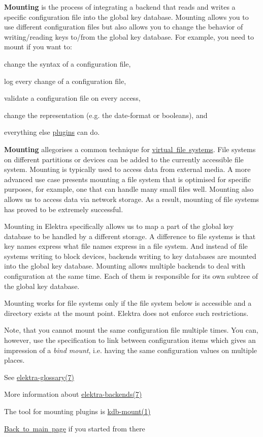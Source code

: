 {\bfseries{Mounting}} is the process of integrating a backend that reads and writes a specific configuration file into the global key database. Mounting allows you to use different configuration files but also allows you to change the behavior of writing/reading keys to/from the global key database. For example, you need to mount if you want to\+:


\begin{DoxyItemize}
\item change the syntax of a configuration file,
\item log every change of a configuration file,
\item validate a configuration file on every access,
\item change the representation (e.\+g. the date-\/format or booleans), and
\item everything else \mbox{\hyperlink{src_plugins_README_md}{plugins}} can do.
\end{DoxyItemize}

{\bfseries{Mounting}} allegorises a common technique for \mbox{\hyperlink{doc_BIGPICTURE_md}{virtual file systems}}. File systems on different partitions or devices can be added to the currently accessible file system. Mounting is typically used to access data from external media. A more advanced use case presents mounting a file system that is optimised for specific purposes, for example, one that can handle many small files well. Mounting also allows us to access data via network storage. As a result, mounting of file systems has proved to be extremely successful.

Mounting in Elektra specifically allows us to map a part of the global key database to be handled by a different storage. A difference to file systems is that key names express what file names express in a file system. And instead of file systems writing to block devices, backends writing to key databases are mounted into the global key database. Mounting allows multiple backends to deal with configuration at the same time. Each of them is responsible for its own subtree of the global key database.

Mounting works for file systems only if the file system below is accessible and a directory exists at the mount point. Elektra does not enforce such restrictions.

Note, that you cannot mount the same configuration file multiple times. You can, however, use the specification to link between configuration items which gives an impression of a {\itshape bind mount}, i.\+e. having the same configuration values on multiple places.


\begin{DoxyItemize}
\item See \mbox{\hyperlink{doc_help_elektra-glossary_md}{elektra-\/glossary(7)}}
\item More information about \mbox{\hyperlink{doc_help_elektra-backends_md}{elektra-\/backends(7)}}
\item The tool for mounting plugins is \mbox{\hyperlink{doc_help_kdb-mount_md}{kdb-\/mount(1)}}
\item \mbox{\hyperlink{README_md}{Back to main page}} if you started from there 
\end{DoxyItemize}
